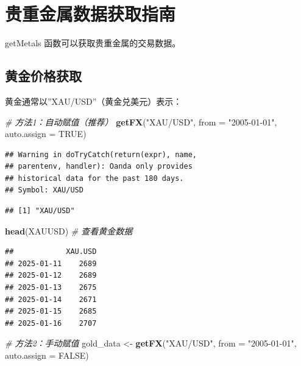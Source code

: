 \documentclass[]{ctexbook}
\newenvironment{Shaded}{\begin{snugshade}}{\end{snugshade}}
\newcommand{\AttributeTok}[1]{\textcolor[rgb]{0.13,0.29,0.53}{#1}}
\newcommand{\CommentTok}[1]{\textcolor[rgb]{0.56,0.35,0.01}{\textit{#1}}}
\newcommand{\ConstantTok}[1]{\textcolor[rgb]{0.56,0.35,0.01}{#1}}
\newcommand{\FunctionTok}[1]{\textcolor[rgb]{0.13,0.29,0.53}{\textbf{#1}}}
\newcommand{\NormalTok}[1]{#1}
\newcommand{\OtherTok}[1]{\textcolor[rgb]{0.56,0.35,0.01}{#1}}
\newcommand{\StringTok}[1]{\textcolor[rgb]{0.31,0.60,0.02}{#1}}
\begin{document}
\section{贵重金属数据获取指南}\label{ux8d35ux91cdux91d1ux5c5eux6570ux636eux83b7ux53d6ux6307ux5357}

getMetals 函数可以获取贵重金属的交易数据。

\subsection{黄金价格获取}\label{ux9ec4ux91d1ux4ef7ux683cux83b7ux53d6}

黄金通常以''XAU/USD''（黄金兑美元）表示：

\begin{Shaded}
\begin{Highlighting}[]
\CommentTok{\# 方法1：自动赋值（推荐）}
\FunctionTok{getFX}\NormalTok{(}\StringTok{"XAU/USD"}\NormalTok{, }\AttributeTok{from =} \StringTok{"2005{-}01{-}01"}\NormalTok{, }\AttributeTok{auto.assign =} \ConstantTok{TRUE}\NormalTok{)}
\end{Highlighting}
\end{Shaded}

\begin{verbatim}
## Warning in doTryCatch(return(expr), name,
## parentenv, handler): Oanda only provides
## historical data for the past 180 days.
## Symbol: XAU/USD
\end{verbatim}

\begin{verbatim}
## [1] "XAU/USD"
\end{verbatim}

\begin{Shaded}
\begin{Highlighting}[]
\FunctionTok{head}\NormalTok{(XAUUSD)  }\CommentTok{\# 查看黄金数据}
\end{Highlighting}
\end{Shaded}

\begin{verbatim}
##            XAU.USD
## 2025-01-11    2689
## 2025-01-12    2689
## 2025-01-13    2675
## 2025-01-14    2671
## 2025-01-15    2685
## 2025-01-16    2707
\end{verbatim}

\begin{Shaded}
\begin{Highlighting}[]
\CommentTok{\# 方法2：手动赋值}
\NormalTok{gold\_data }\OtherTok{\textless{}{-}} \FunctionTok{getFX}\NormalTok{(}\StringTok{"XAU/USD"}\NormalTok{, }\AttributeTok{from =} \StringTok{"2005{-}01{-}01"}\NormalTok{, }\AttributeTok{auto.assign =} \ConstantTok{FALSE}\NormalTok{)}
\end{Highlighting}
\end{Shaded}
\end{document}
